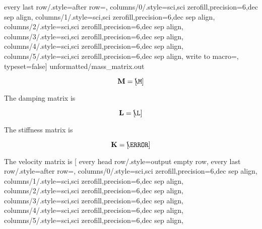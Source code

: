 every last row/.style={after row={}},
columns/0/.style={sci,sci zerofill,precision=6,dec sep align},
columns/1/.style={sci,sci zerofill,precision=6,dec sep align},
columns/2/.style={sci,sci zerofill,precision=6,dec sep align},
columns/3/.style={sci,sci zerofill,precision=6,dec sep align},
columns/4/.style={sci,sci zerofill,precision=6,dec sep align},
columns/5/.style={sci,sci zerofill,precision=6,dec sep align},
write to macro=\M,
typeset=false]
{unformatted/mass_matrix.out}
\begin{footnotesize}
\[
\mathbf{M}=
\left[\!\!
\M
\right]
\]
\end{footnotesize}
The damping matrix is
\begin{footnotesize}
\[
\mathbf{L}=
\left[\!\!
\L
\right]
\]
\end{footnotesize}
The stiffness matrix is
\begin{footnotesize}
\[
\mathbf{K}=
\left[\!\!
\K
\right]
\]
\end{footnotesize}
The velocity matrix is
\pgfplotstabletypeset[
every head row/.style={output empty row},
every last row/.style={after row={}},
columns/0/.style={sci,sci zerofill,precision=6,dec sep align},
columns/1/.style={sci,sci zerofill,precision=6,dec sep align},
columns/2/.style={sci,sci zerofill,precision=6,dec sep align},
columns/3/.style={sci,sci zerofill,precision=6,dec sep align},
columns/4/.style={sci,sci zerofill,precision=6,dec sep align},
columns/5/.style={sci,sci zerofill,precision=6,dec sep align},
